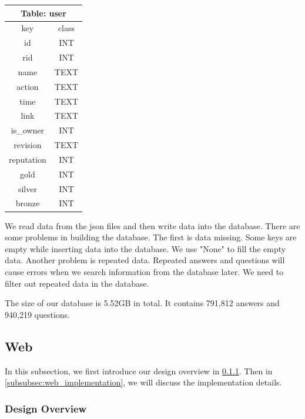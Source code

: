\documentclass[10pt,journal,compsoc]{IEEEtran}
\begin{document}
\begin{table}[H]
\centering
\begin{tabular}{cc}
\toprule
\multicolumn{2}{c}{\textbf{Table: user}} \\
\midrule
key                   & class             \\
\midrule
id                    & INT               \\
rid                   & INT               \\
name                  & TEXT               \\
action & TEXT\\
time & TEXT\\
link & TEXT\\
is\_owner & INT\\
revision & TEXT\\
reputation & INT\\
gold & INT \\
silver & INT\\
bronze & INT\\
\bottomrule
\end{tabular}
\end{table}
 
We read data from the json files and then write data into the database. There are some problems in building the database. The first is data missing. Some keys are empty while inserting data into the database. We use "None" to fill the empty data. Another problem is repeated data. Repeated answers and questions will cause errors when we search information from the database later. We need to filter out repeated data in the database.

The size of our database is 5.52GB in total. It contains 791,812 answers and 940,219 questions.
\subsection{Web}
\label{subsec:web}

In this subsection, we first introduce our design overview in \ref{subsubsec:design_overview}. Then in \ref{subsubsec:web_implementation}, we will discuss the implementation details.

\subsubsection{Design Overview}
\label{subsubsec:design_overview}
\end{document}
